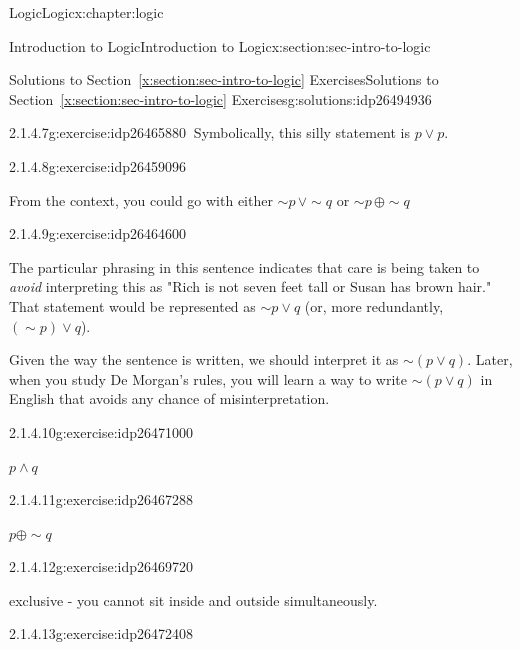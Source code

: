 \documentclass[twoside,10pt,]{book}
\newcommand{\xreffont}{\relax}
\numberwithin{equation}{section}
\begin{document}
\begin{chapterptx}{Logic}{}{Logic}{}{}{x:chapter:logic}
\begin{sectionptx}{Introduction to Logic}{}{Introduction to Logic}{}{}{x:section:sec-intro-to-logic}
\begin{solutions-subsection}{Solutions to Section~{\xreffont\ref*{x:section:sec-intro-to-logic}} Exercises}{}{Solutions to Section~{\xreffont\ref*{x:section:sec-intro-to-logic}} Exercises}{}{}{g:solutions:idp26494936}
\begin{exercisegroup}
\begin{divisionsolutioneg}{2.1.4.7}{}{g:exercise:idp26465880}
\noindent\hypertarget{g:solution:idp26463064-main}{}\(\ \)Symbolically, this silly statement is \(p{\vee} p\).\end{divisionsolutioneg}%
\begin{divisionsolutioneg}{2.1.4.8}{}{g:exercise:idp26459096}%
\par\smallskip%
\noindent\hypertarget{g:solution:idp26465240-main}{}From the context, you could go with either \(\sim\!{p}\,{\vee} \sim\!{q}\) or \(\sim\!{p}\,{\oplus}\sim\!{q}\)\end{divisionsolutioneg}%
\begin{divisionsolutioneg}{2.1.4.9}{}{g:exercise:idp26464600}%
\par\smallskip%
\noindent\hypertarget{g:solution:idp26460504-main}{}The particular phrasing in this sentence indicates that care is being taken to \emph{avoid} interpreting this as "Rich is not seven feet tall or Susan has brown hair."  That statement would be represented as \(\sim\!{p}{\vee} q\) (or, more redundantly, \((\sim\!{p}){\vee} q\)).%
\par
Given the way the sentence is written, we should interpret it as \(\sim\! (p{\vee} q)\).  Later, when you study De Morgan's rules, you will learn a way to write \(\sim\!(p{\vee} q)\) in English that avoids any chance of misinterpretation.%
\end{divisionsolutioneg}%
\begin{divisionsolutioneg}{2.1.4.10}{}{g:exercise:idp26471000}%
\par\smallskip%
\noindent\hypertarget{g:solution:idp26472920-main}{}\(p{\wedge} q\)\end{divisionsolutioneg}%
\begin{divisionsolutioneg}{2.1.4.11}{}{g:exercise:idp26467288}%
\par\smallskip%
\noindent\hypertarget{g:solution:idp26474328-main}{}\(p{\oplus} \sim\!{q}\)\end{divisionsolutioneg}%
\end{exercisegroup}
\par\medskip\noindent
\begin{exercisegroup}
\begin{divisionsolutioneg}{2.1.4.12}{}{g:exercise:idp26469720}%
\par\smallskip%
\noindent\hypertarget{g:solution:idp26473560-main}{}exclusive - you cannot sit inside and outside simultaneously.\end{divisionsolutioneg}%
\begin{divisionsolutioneg}{2.1.4.13}{}{g:exercise:idp26472408}%

\end{divisionsolutioneg}
\end{exercisegroup}
\end{solutions-subsection}
\end{sectionptx}
\end{chapterptx}
\end{document}
